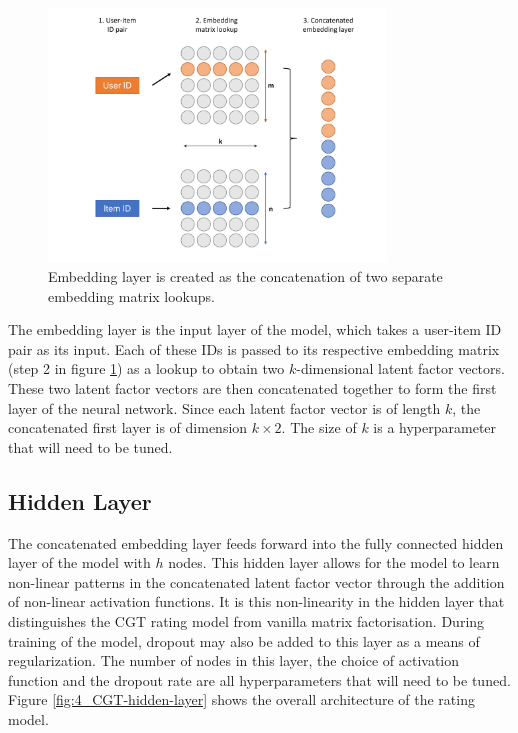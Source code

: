 \begin{figure}[H]
\centering
\includegraphics[width=0.8\textwidth]{Figures/4_CGT-embedding-layer.pdf}
\decoRule
\caption[Embedding layer]{Embedding layer is created as the concatenation of two separate embedding matrix lookups.}
\label{fig:4_CGT-embedding-layer}
\end{figure}

The embedding layer is the input layer of the model, which takes a user-item ID pair as its input. Each of these IDs is passed to its respective embedding matrix (step 2 in figure \ref{fig:4_CGT-embedding-layer}) as a lookup to obtain two $k$-dimensional latent factor vectors. These two latent factor vectors are then concatenated together to form the first layer of the neural network. Since each latent factor vector is of length $k$, the concatenated first layer is of dimension $k\times2$. The size of $k$ is a hyperparameter that will need to be tuned.

\subsection{Hidden Layer}
The concatenated embedding layer feeds forward into the fully connected hidden layer of the model with $h$ nodes. This hidden layer allows for the model to learn non-linear patterns in the concatenated latent factor vector through the addition of non-linear activation functions. It is this non-linearity in the hidden layer that distinguishes the CGT rating model from vanilla matrix factorisation. During training of the model, dropout may also be added to this layer as a means of regularization. The number of nodes in this layer, the choice of activation function and the dropout rate are all hyperparameters that will need to be tuned. Figure \ref{fig:4_CGT-hidden-layer} shows the overall architecture of the rating model.

